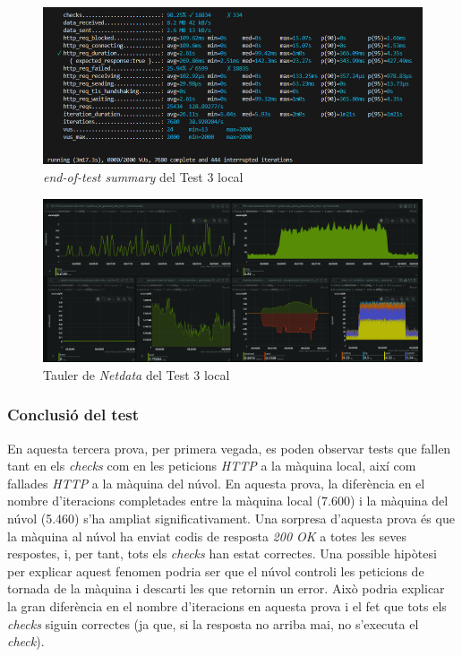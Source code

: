 \begin{figure}[!htbp]
    \includegraphics[width=1\textwidth]{Imatges/Tests/Local/3l-k6.png}  
    \caption{\textit{end-of-test summary} del Test 3 local}
\end{figure}

\begin{figure}[!htbp]
    \includegraphics[width=1\textwidth]{Imatges/Tests/Local/3l-netdata.png}  
    \caption{Tauler de \textit{Netdata} del Test 3 local}
\end{figure}
\subsubsection{Conclusió del test}

En aquesta tercera prova, per primera vegada, es poden observar tests que fallen tant en els \textit{checks} com en les peticions \textit{HTTP} a la màquina local, així com fallades \textit{HTTP} a la màquina del núvol. En aquesta prova, la diferència en el nombre d'iteracions completades entre la màquina local (7.600) i la màquina del núvol (5.460) s'ha ampliat significativament. Una sorpresa d'aquesta prova és que la màquina al núvol ha enviat codis de resposta \textit{200 OK} a totes les seves respostes, i, per tant, tots els \textit{checks} han estat correctes. Una possible hipòtesi per explicar aquest fenomen podria ser que el núvol controli les peticions de tornada de la màquina i descarti les que retornin un error. Això podria explicar la gran diferència en el nombre d'iteracions en aquesta prova i el fet que tots els \textit{checks} siguin correctes (ja que, si la resposta no arriba mai, no s'executa el \textit{check}).

